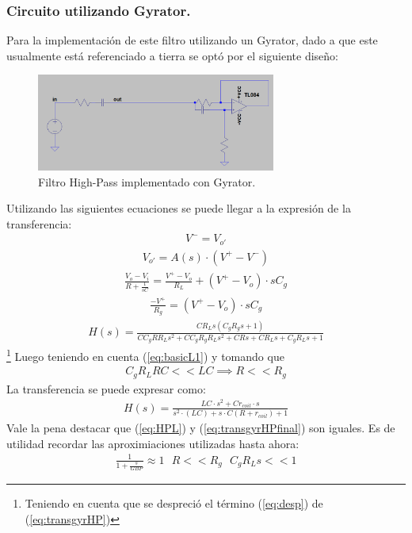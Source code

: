 \documentclass[a4paper]{article}
\begin{document}
\subsubsection{Circuito utilizando Gyrator.}
Para la implementación de este filtro utilizando un Gyrator, dado a que este usualmente está referenciado a tierra  se optó por el siguiente diseño:
\begin{figure}[H]	
	\centering
	\includegraphics[width=0.7\textwidth]{ImagenesEj2/gyrHP.PNG}
	\caption{Filtro High-Pass implementado con Gyrator.}
	\label{fig:gyrHP}
\end{figure}



Utilizando las siguientes ecuaciones se puede llegar a la expresión de la transferencia:
\begin{align}V^- = V_{o'}\end{align}
\begin{align}V_{o'} = A(s)\cdot (V^+-V^-)\end{align}
\begin{align}\frac{V_o-V_i}{R+\frac{1}{sC}} = \frac{V^+-V_o}{R_L}+(V^+-V_o)\cdot sC_g\end{align}
\begin{align}\frac{-V^+}{R_g}=(V^+-V_o)\cdot sC_g\end{align}
\begin{align} H(s) = \frac{C R_L s \left(C_g R_g s + 1\right)}{C C_g R R_L s^{2} + C C_g R_g R_L s^{2} + C R s + C R_L s + C_g R_L s + 1}\label{eq:transgyrHP}\end{align}\footnote{Teniendo en cuenta que se despreció el término (\ref{eq:desp}) de (\ref{eq:transgyrHP})}
Luego teniendo en cuenta (\ref{eq:basicL1}) y tomando que
\begin{align} C_gR_LRC<<LC \implies R<<R_g \end{align}
La transferencia  se puede expresar como:
 \begin{align} H(s) = \frac{LC\cdot s^2+Cr_{coil}\cdot s}{s^2 \cdot (LC)+s\cdot C(R+r_{coil})+1}\label{eq:transgyrHPfinal} 
\end{align}
Vale la pena destacar que (\ref{eq:HPL}) y (\ref{eq:transgyrHPfinal}) son iguales.
Es de utilidad recordar las aproximiaciones utilizadas hasta ahora:
\begin{align}  \frac{1}{1+\frac{s}{GBP}}\approx 1  \ \ \ R<<R_g \ \ \ C_gR_Ls << 1 \label{eq:basicL2}\end{align}
\end{document}
